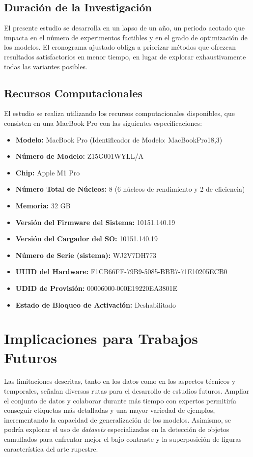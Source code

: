 \subsection{Duración de la Investigación}

El presente estudio se desarrolla en un lapso de un año, un periodo acotado que impacta en el número de experimentos factibles y en el grado de optimización de los modelos.
El cronograma ajustado obliga a priorizar métodos que ofrezcan resultados satisfactorios en menor tiempo, en lugar de explorar exhaustivamente todas las variantes posibles.

\subsection{Recursos Computacionales}

El estudio se realiza utilizando los recursos computacionales disponibles, que consisten en una MacBook Pro con las siguientes especificaciones:

\begin{itemize}
   \item \textbf{Modelo:} MacBook Pro (Identificador de Modelo: MacBookPro18,3)
   \item \textbf{Número de Modelo:} Z15G001WYLL/A
   \item \textbf{Chip:} Apple M1 Pro
   \item \textbf{Número Total de Núcleos:} 8 (6 núcleos de rendimiento y 2 de eficiencia)
   \item \textbf{Memoria:} 32 GB
   \item \textbf{Versión del Firmware del Sistema:} 10151.140.19
   \item \textbf{Versión del Cargador del SO:} 10151.140.19
   \item \textbf{Número de Serie (sistema):} WJ2V7DH773
   \item \textbf{UUID del Hardware:} F1CB66FF-79B9-5085-BBB7-71E10205ECB0
   \item \textbf{UDID de Provisión:} 00006000-000E19220EA3801E
   \item \textbf{Estado de Bloqueo de Activación:} Deshabilitado
\end{itemize}


\section{Implicaciones para Trabajos Futuros}

Las limitaciones descritas, tanto en los datos como en los aspectos técnicos y temporales, señalan diversas rutas para el desarrollo de estudios futuros.
Ampliar el conjunto de datos y colaborar durante más tiempo con expertos permitiría conseguir etiquetas más detalladas y una mayor variedad de ejemplos, incrementando la capacidad de generalización de los modelos.
Asimismo, se podría explorar el uso de \emph{datasets} especializados en la detección de objetos camuflados para enfrentar mejor el bajo contraste y la superposición de figuras característica del arte rupestre.

